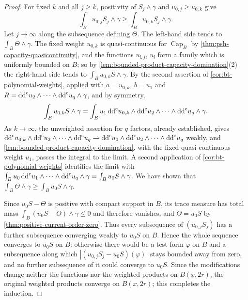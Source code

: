 \begin{proof}
For fixed $k$ and all $j\ge k$, positivity of $S_j\wedge\gamma$ and $u_{0,j}\ge u_{0,k}$ give
\[
 \int_Bu_{0,j}S_j\wedge\gamma\ge\int_Bu_{0,k}S_j\wedge\gamma.
\]
Let $j\to\infty$ along the subsequence defining $\Theta$. The left-hand side tends to $\int_B\Theta\wedge\gamma$. The fixed weight $u_{0,k}$ is quasi-continuous for $\operatorname{Cap}_B$ by \cref{thm:psh-capacity-quasicontinuity}, and the functions $u_{l,j}$, $u_l$ form a family which is uniformly bounded on $B$; so by \cref{lem:bounded-product-capacity-domination}(2) the right-hand side tends to $\int_Bu_{0,k}S\wedge\gamma$. By the second assertion of \cref{cor:bt-polynomial-weights}, applied with $a=u_{0,k}$, $b=u_1$ and $R=\mathrm{dd}^{\mathrm{c}} u_2\wedge\cdots\wedge\mathrm{dd}^{\mathrm{c}} u_q\wedge\gamma$, and by symmetry,
\[
 \int_Bu_{0,k}S\wedge\gamma=\int_Bu_1\,\mathrm{dd}^{\mathrm{c}} u_{0,k}\wedge\mathrm{dd}^{\mathrm{c}} u_2\wedge\cdots\wedge\mathrm{dd}^{\mathrm{c}} u_q\wedge\gamma.
\]
As $k\to\infty$, the unweighted assertion for $q$ factors, already established, gives $\mathrm{dd}^{\mathrm{c}} u_{0,k}\wedge\mathrm{dd}^{\mathrm{c}} u_2\wedge\cdots\wedge\mathrm{dd}^{\mathrm{c}} u_q\rightharpoonup\mathrm{dd}^{\mathrm{c}} u_0\wedge\mathrm{dd}^{\mathrm{c}} u_2\wedge\cdots\wedge\mathrm{dd}^{\mathrm{c}} u_q$ weakly, and \cref{lem:bounded-product-capacity-domination}, with the fixed quasi-continuous weight $u_1$, passes the integral to the limit. A second application of \cref{cor:bt-polynomial-weights} identifies the limit with $\int_Bu_0\,\mathrm{dd}^{\mathrm{c}} u_1\wedge\cdots\wedge\mathrm{dd}^{\mathrm{c}} u_q\wedge\gamma=\int_Bu_0S\wedge\gamma$. We have shown that $\int_B\Theta\wedge\gamma\ge\int_Bu_0S\wedge\gamma$.

Since $u_0S-\Theta$ is positive with compact support in $B$, its trace measure has total mass $\int_B(u_0S-\Theta)\wedge\gamma\le0$ and therefore vanishes, and $\Theta=u_0S$ by \cref{thm:positive-current-order-zero}. Thus every subsequence of $(u_{0,j}S_j)$ has a further subsequence converging weakly to $u_0S$ on $B$. Hence the whole sequence converges to $u_0S$ on $B$: otherwise there would be a test form $\varphi$ on $B$ and a subsequence along which $|(u_{0,j}S_j-u_0S)(\varphi)|$ stays bounded away from zero, and no further subsequence of it could converge to $u_0S$. Since the modifications change neither the functions nor the weighted products on $B(x,2r)$, the original weighted products converge on $B(x,2r)$; this completes the induction.


\end{proof}

